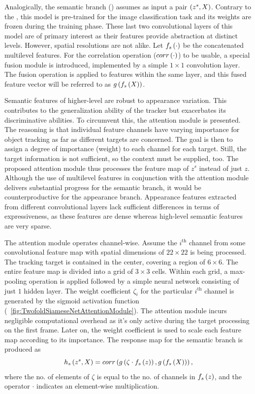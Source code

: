 Analogically, the semantic branch () assumes as input a pair $\left( {z^s, X} \right)$. Contrary to the , this model is pre-trained for the image classification task and its weights are frozen during the training phase. These last two convolutional layers of this model are of primary interest as their features provide abstraction at distinct levels. However, spatial resolutions are not alike. Let ${f_s} \left( \cdot \right)$ be the concatenated multilevel features. For the correlation operation (${corr} \left( \cdot \right)$) to be usable, a special fusion module is introduced, implemented by a simple $1 \times 1$ convolution layer. The fusion operation is applied to features within the same layer, and this fused feature vector will be referred to as ${g} \left( {f_s} \left( X \right) \right)$.

Semantic features of higher-level are robust to appearance variation. This contributes to the generalization ability of the tracker but exacerbates its discriminative abilities. To circumvent this, the attention module is presented. The reasoning is that individual feature channels have varying importance for object tracking as far as different targets are concerned. The goal is then to assign a degree of importance (weight) to each channel for each target. Still, the target information is not sufficient, so the context must be supplied, too. The proposed attention module thus processes the feature map of $z^s$ instead of just $z$. Although the use of multilevel features in conjunction with the attention module delivers substantial progress for the semantic branch, it would be counterproductive for the appearance branch. Appearance features extracted from different convolutional layers lack sufficient differences in terms of expressiveness, as these features are dense whereas high-level semantic features are very sparse.

The attention module operates channel-wise. Assume the $i^{\text{th}}$ channel from some convolutional feature map with spatial dimensions of $22 \times 22$ is being processed. The tracking target is contained in the center, covering a region of $6 \times 6$. The entire feature map is divided into a grid of $3 \times 3$ cells. Within each grid, a max-pooling operation is applied followed by a simple neural network consisting of just $1$ hidden layer. The weight coefficient $\zeta_i$ for the particular $i^{\text{th}}$ channel is generated by the sigmoid activation function (\figstr{}~\ref{fig:TwofoldSiameseNetAttentionModule}). The attention module incurs negligible computational overhead as it's only active during the target processing on the first frame. Later on, the weight coefficient is used to scale each feature map according to its importance. The response map for the semantic branch is produced as
\begin{equation}
    {h_s} \left( z^s, X \right) =
    {corr} \left( 
        {g} \left( \zeta \cdot {f_s} \left( z \right) \right),
        {g} \left( {f_s} \left( X \right) \right)
     \right),
\end{equation}
where the no. of elements of $\zeta$ is equal to the no. of channels in ${f_s} \left( z \right)$, and the operator $\cdot$ indicates an element-wise multiplication.

